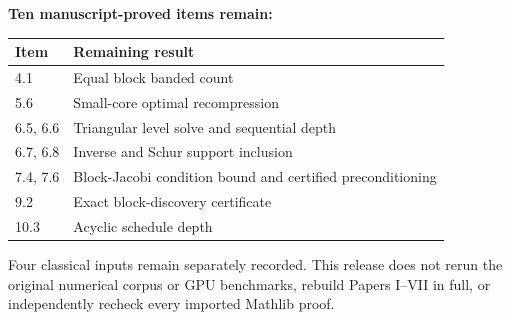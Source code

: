 \textbf{Ten manuscript-proved items remain:}
\begin{center}\small
\begin{tabular}{@{}lp{}@{}}
\toprule
Item & Remaining result\\\midrule
4.1 & Equal block banded count\\
5.6 & Small-core optimal recompression\\
6.5, 6.6 & Triangular level solve and sequential depth\\
6.7, 6.8 & Inverse and Schur support inclusion\\
7.4, 7.6 & Block-Jacobi condition bound and certified preconditioning\\
9.2 & Exact block-discovery certificate\\
10.3 & Acyclic schedule depth\\\bottomrule
\end{tabular}
\end{center}
Four classical inputs remain separately recorded. This release does not rerun the original numerical corpus or GPU benchmarks, rebuild Papers I--VII in full, or independently recheck every imported Mathlib proof.

